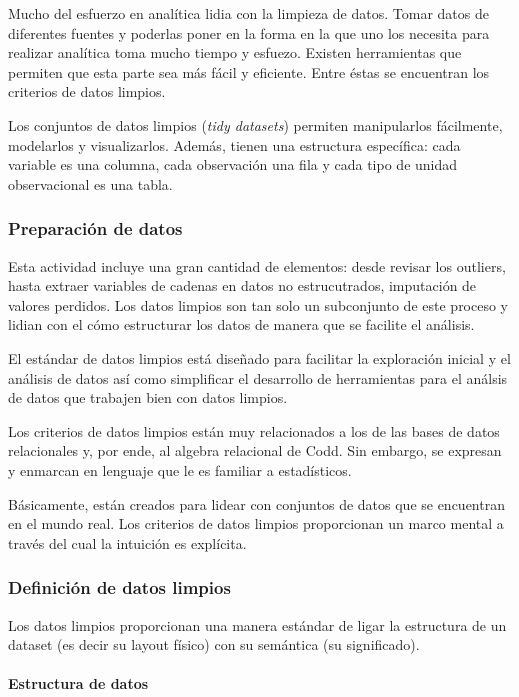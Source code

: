 \documentclass[]{article}
\begin{document}
Mucho del esfuerzo en analítica lidia con la limpieza de datos. Tomar
datos de diferentes fuentes y poderlas poner en la forma en la que uno
los necesita para realizar analítica toma mucho tiempo y esfuezo.
Existen herramientas que permiten que esta parte sea más fácil y
eficiente. Entre éstas se encuentran los criterios de datos limpios.

Los conjuntos de datos limpios (\emph{tidy datasets}) permiten
manipularlos fácilmente, modelarlos y visualizarlos. Además, tienen una
estructura específica: cada variable es una columna, cada observación
una fila y cada tipo de unidad observacional es una tabla.

\subsubsection{Preparación de datos}\label{preparacion-de-datos}

Esta actividad incluye una gran cantidad de elementos: desde revisar los
outliers, hasta extraer variables de cadenas en datos no estrucutrados,
imputación de valores perdidos. Los datos limpios son tan solo un
subconjunto de este proceso y lidian con el cómo estructurar los datos
de manera que se facilite el análisis.

El estándar de datos limpios está diseñado para facilitar la exploración
inicial y el análisis de datos así como simplificar el desarrollo de
herramientas para el análsis de datos que trabajen bien con datos
limpios.

Los criterios de datos limpios están muy relacionados a los de las bases
de datos relacionales y, por ende, al algebra relacional de Codd. Sin
embargo, se expresan y enmarcan en lenguaje que le es familiar a
estadísticos.

Básicamente, están creados para lidear con conjuntos de datos que se
encuentran en el mundo real. Los criterios de datos limpios proporcionan
un marco mental a través del cual la intuición es explícita.

\subsubsection{Definición de datos
limpios}\label{definicion-de-datos-limpios}

Los datos limpios proporcionan una manera estándar de ligar la
estructura de un dataset (es decir su layout físico) con su semántica
(su significado).

\paragraph{Estructura de datos}\label{estructura-de-datos}
\end{document}
